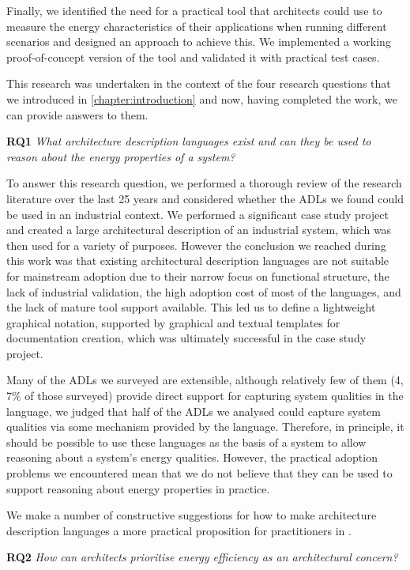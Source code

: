 Finally, we identified the need for a practical tool that architects could use to measure the energy characteristics of their applications when running different scenarios and designed an approach to achieve this.  We implemented a working proof-of-concept version of the tool and validated it with practical test cases.

This research was undertaken in the context of the four research questions that we introduced in \cref{chapter:introduction} and now, having completed the work, we can provide answers to them.

\textbf{RQ1} \emph{What architecture description languages exist and can they be used to reason about the energy properties of a system?}

To answer this research question, we performed a thorough review of the research literature over the last 25 years and considered whether the ADLs we found could be used in an industrial context.  We performed a significant case study project and created a large architectural description of an industrial system, which was then used for a variety of purposes.  However the conclusion we reached during this work was that existing architectural description languages are not suitable for mainstream adoption due to their narrow focus on functional structure, the lack of industrial validation, the high adoption cost of most of the languages, and the lack of mature tool support available.  This led us to define a lightweight graphical notation, supported by graphical and textual templates for documentation creation, which was ultimately successful in the case study project.

Many of the ADLs we surveyed are extensible, although relatively few of them (4, 7\% of those surveyed) provide direct support for capturing system qualities in the language, we judged that half of the ADLs we analysed could capture system qualities via some mechanism provided by the language.  Therefore, in principle, it should be possible to use these languages as the basis of a system to allow reasoning about a system's energy qualities.  However, the practical adoption problems we encountered mean that we do not believe that they can be used to support reasoning about energy properties in practice.

We make a number of constructive suggestions for how to make architecture description languages a more practical proposition for practitioners in
 .

\textbf{RQ2} \emph{How can architects prioritise energy efficiency as an architectural concern?}

